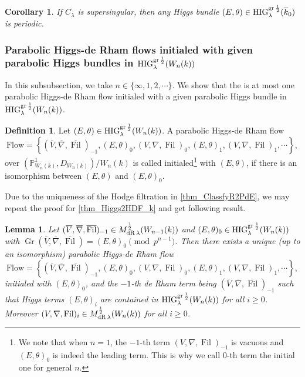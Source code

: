 \documentclass[12pt,twoside]{book}
\theoremstyle{plain}
\newtheorem{lemma}[lemma]{Lemma}
\newtheorem{corollary}[corollary]{Corollary}
\theoremstyle{definition}
\newtheorem{definition}[definition]{Definition}
\theoremstyle{remark}
\DeclareMathOperator\Fil{Fil}
\DeclareMathOperator\Gr{Gr}
\numberwithin{equation}{section}
\def\High{{\mathrm{HIG}^{{\rm gr}\,{1\over 2}}_{\lambda}}}
\def\MdRh{{M^{{1\over 2}}_{{\rm dR}\,\lambda}}}
\def\Flow{\mathrm{Flow}}
\def\BBn{{(\mathbb P^1_{W_n(k)}, D_{W_n(k)})/W_n(k)}}
\def\bark{{\overline k}_0}
\begin{document}
\begin{corollary} \label{mthm_HIG2PHIG}
If $C_\lambda$ is supersingular, then any Higgs bundle $(E,\theta)\in {\High}(\bark)$ is periodic.
\end{corollary}


\subsubsection{Parabolic Higgs-de Rham flows initialed with given parabolic Higgs bundles in $\High(W_n(k))$}

In this subsubsection, we take $n\in\{\infty,1,2,\cdots\}$. We show that the is at most one parabolic Higgs-de Rham flow initialed with a given parabolic Higgs bundle in $\High(W_n(k))$.

\begin{definition} \label{thm_Higgs2HDF_Wn}
Let $(E,\theta) \in \High(W_n(k))$. A parabolic Higgs-de Rham flow
\[\Flow = \left\{
(\overline{V},\overline{\nabla},\overline{\Fil})_{-1},
(E,\theta)_{0},
(V,\nabla,\Fil)_{0},
(E,\theta)_{1},
(V,\nabla,\Fil)_{1},
\cdots\right\},\]
over $\BBn$ is called initialed\footnote{We note that when $n=1$, the $-1$-th term $(V,\nabla,\Fil)_{-1}$ is vacuous and $(E,\theta)_{0}$ is indeed the leading term. This is why we call $0$-th term the initial one for general $n$.} with $(E,\theta)$, if there is an isomorphism between $(E,\theta)$ and $(E,\theta)_0$.
\end{definition}

Due to the uniqueness of the Hodge filtration in \autoref{thm_ClassfyR2PdE}, we may repeat the proof for \autoref{thm_Higgs2HDF_k} and get following result.
\begin{lemma} \label{thm_Higgs2HDF_W}
Let $(\overline{V},\overline{\nabla},\overline{\Fil})_{-1} \in \MdRh(W_{n-1}(k))$ and $(E,\theta)_{0}\in \High(W_n(k))$ with $\Gr(\overline{V},\overline{\nabla},\overline{\Fil}) = (E,\theta)_{0}\pmod{p^{n-1}}$. Then there exists a unique (up to an isomorphism) parabolic Higgs-de Rham flow
\[\Flow = \left\{
(\overline{V},\overline{\nabla},\overline{\Fil})_{-1},
(E,\theta)_{0},
(V,\nabla,\Fil)_{0},
(E,\theta)_{1},
(V,\nabla,\Fil)_{1},
\cdots\right\},\]
initialed with $(E,\theta)_0$, and the $-1$-th de Rham term being $(\overline{V},\overline{\nabla},\overline{\Fil})_{-1}$ such that Higgs terms $(E,\theta)_{i}$ are contained in $\High(W_n(k))$ for all $i\geq 0$.
Moreover $(V,\nabla,\Fil)_{i}\in\MdRh(W_n(k))$ for all $i\geq 0$.
\end{lemma}
\end{document}
